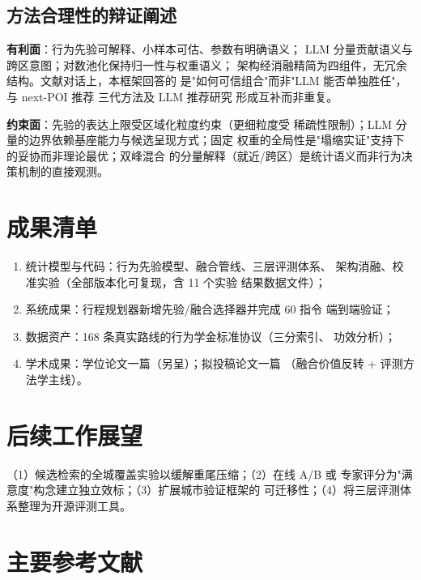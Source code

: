 \documentclass[UTF8,zihao=-4,a4paper]{ctexart}
\begin{document}
\subsection{方法合理性的辩证阐述}

\textbf{有利面}：行为先验可解释、小样本可估、参数有明确语义；
LLM 分量贡献语义与跨区意图；对数池化保持归一性与权重语义；
架构经消融精简为四组件，无冗余结构。文献对话上，本框架回答的
是"如何可信组合"而非"LLM 能否单独胜任"，与 next-POI 推荐
三代方法\cite{rendle2010fpmc,cheng2013fpmclr,feng2015prme,
liu2016strnn,liu2019arnn,li2022lstpm}及 LLM 推荐研究
\cite{li2024llmpoi,wu2023llm4rec}形成互补而非重复。

\textbf{约束面}：先验的表达上限受区域化粒度约束（更细粒度受
稀疏性限制）；LLM 分量的边界依赖基座能力与候选呈现方式；固定
权重的全局性是"塌缩实证"支持下的妥协而非理论最优；双峰混合
的分量解释（就近/跨区）是统计语义而非行为决策机制的直接观测。

\section{成果清单}

\begin{enumerate}
  \item 统计模型与代码：行为先验模型、融合管线、三层评测体系、
        架构消融、校准实验（全部版本化可复现，含 11 个实验
        结果数据文件）；
  \item 系统成果：行程规划器新增先验/融合选择器并完成 60 指令
        端到端验证；
  \item 数据资产：168 条真实路线的行为学金标准协议（三分索引、
        功效分析）；
  \item 学术成果：学位论文一篇（另呈）；拟投稿论文一篇
        （融合价值反转 + 评测方法学主线）。
\end{enumerate}

\section{后续工作展望}

（1）候选检索的全城覆盖实验以缓解重尾压缩；（2）在线 A/B 或
专家评分为"满意度"构念建立独立效标；（3）扩展城市验证框架的
可迁移性；（4）将三层评测体系整理为开源评测工具。

\section{主要参考文献}
\end{document}
